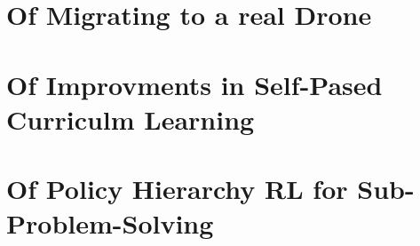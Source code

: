 \section{Of Migrating to a real Drone}

\newpage

\section{Of Improvments in Self-Pased Curriculm Learning}

\newpage

\section{Of Policy Hierarchy RL for Sub-Problem-Solving}
